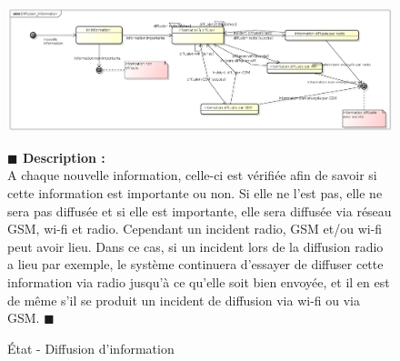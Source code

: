 \documentclass[11pt, titlepage]{report}
\newcommand{\debutDescription}{\noindent\textbf{\textcolor{DescriptionColor}{$\blacksquare$  Description : \\}}}
\newcommand{\finDescription}{\noindent\textcolor{DescriptionColor}{$\blacksquare$}}
\begin{document}
\begin{figure}[h!]
\begin{center}
\includegraphics[scale=.4]{../images/diagrammes/uml/exigence_5/etat_diffusion_information.png} 
\caption{État - Diffusion d'information}
\end{center}
\debutDescription
	A chaque nouvelle information, celle-ci est vérifiée afin de savoir si cette information est importante ou non. Si elle ne l'est pas, elle ne sera pas diffusée et si elle est importante, elle sera diffusée via réseau GSM, wi-fi et radio.
	Cependant un incident radio, GSM et/ou wi-fi peut avoir lieu. Dans ce cas, si un incident lors de la diffusion radio a lieu par exemple, le système continuera d'essayer de diffuser cette information via radio jusqu'à ce qu'elle soit bien envoyée, et il en est de même s'il se produit un incident de diffusion via wi-fi ou via GSM.
\finDescription
\end{figure}
\end{document}
